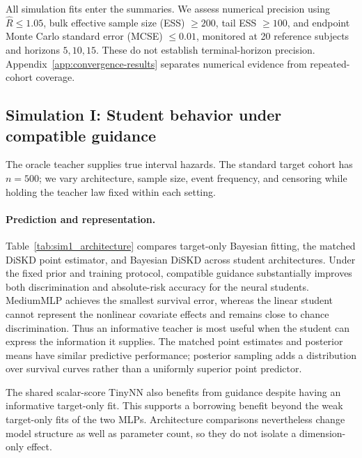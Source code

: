 \documentclass{article} %
\begin{document}
All simulation fits enter the summaries. We assess numerical precision using $\widehat R\le1.05$, bulk effective sample size (ESS) $\ge200$, tail ESS $\ge100$, and endpoint Monte Carlo standard error (MCSE) $\le0.01$, monitored at 20 reference subjects and horizons $5,10,15$. These do not establish terminal-horizon precision. Appendix~\ref{app:convergence-results} separates numerical evidence from repeated-cohort coverage.

\subsection{Simulation I: Student behavior under compatible guidance}
\label{sec:sim1_results}
The oracle teacher supplies true interval hazards. The standard target cohort has $n=500$; we vary architecture, sample size, event frequency, and censoring while holding the teacher law fixed within each setting.

\paragraph{Prediction and representation.}
\label{sec:sim1_capacity}
Table~\ref{tab:sim1_architecture} compares target-only Bayesian fitting, the matched DiSKD point estimator, and Bayesian DiSKD across student architectures. Under the fixed prior and training protocol, compatible guidance substantially improves both discrimination and absolute-risk accuracy for the neural students. MediumMLP achieves the smallest survival error, whereas the linear student cannot represent the nonlinear covariate effects and remains close to chance discrimination. Thus an informative teacher is most useful when the student can express the information it supplies. The matched point estimates and posterior means have similar predictive performance; posterior sampling adds a distribution over survival curves rather than a uniformly superior point predictor.

The shared scalar-score TinyNN also benefits from guidance despite having an informative target-only fit. This supports a borrowing benefit beyond the weak target-only fits of the two MLPs. Architecture comparisons nevertheless change model structure as well as parameter count, so they do not isolate a dimension-only effect.
\end{document}
